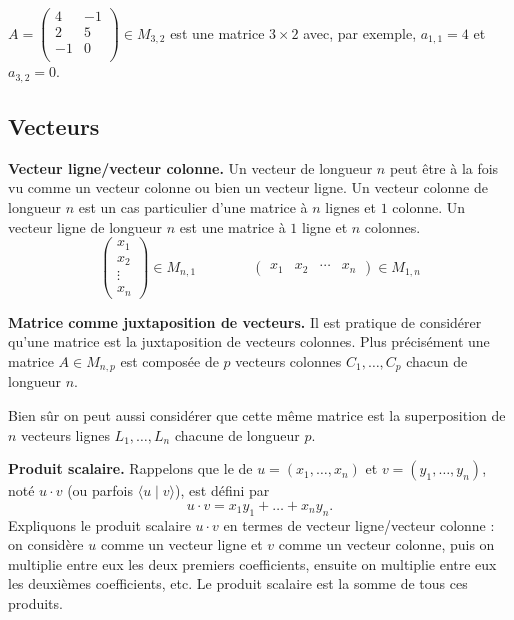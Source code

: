 \documentclass[11pt,class=report,crop=false]{standalone}
\begin{document}
\begin{exemple}
$ A  =  \left(
\begin{array}{ccc}
	4 & -1 \\
	2 & 5  \\
	-1 & 0 \\
\end{array}
\right) \in M_{3,2}$
est une matrice $3\times 2$ avec, par exemple, $a_{1,1}=4$ et $a_{3,2}=0$.
\end{exemple}


\subsection{Vecteurs}

\textbf{Vecteur ligne/vecteur colonne.}
Un vecteur de longueur $n$ peut être à la fois vu comme un vecteur colonne ou bien un vecteur ligne.
Un vecteur colonne de longueur $n$ est un cas particulier d'une matrice à $n$ lignes et $1$ colonne.
Un vecteur ligne de longueur $n$ est une matrice à $1$ ligne et $n$ colonnes.
$$\begin{pmatrix} x_1\\ x_2 \\ \vdots \\ x_n \end{pmatrix} \in M_{n,1}
\qquad \qquad 
\begin{pmatrix} x_1 & x_2 & \cdots & x_n \end{pmatrix} \in M_{1,n}
$$


\textbf{Matrice comme juxtaposition de vecteurs.}
Il est pratique de considérer qu'une matrice est la juxtaposition de vecteurs colonnes. Plus précisément une matrice $A \in M_{n,p}$ est composée de $p$ vecteurs colonnes $C_1,\ldots,C_p$ chacun de longueur $n$.




Bien sûr on peut aussi considérer que cette même matrice est la superposition de $n$ vecteurs lignes $L_1,\ldots,L_n$ chacune de longueur $p$.


\textbf{Produit scalaire.}
Rappelons que le  de $u=(x_1,\ldots ,x_n)$ et $v=(y_1,\ldots ,y_n)$, noté $u \cdot v$ (ou parfois $\langle u \mid v\rangle$), est défini par
$$u \cdot v= x_1y_1+\dots +x_ny_n.$$
Expliquons le produit scalaire $u \cdot v$ en termes de vecteur ligne/vecteur colonne : on considère $u$ comme un vecteur ligne et $v$ comme un vecteur colonne, puis on multiplie entre eux les deux premiers coefficients, ensuite on multiplie entre eux les deuxièmes coefficients, etc. Le produit scalaire est la somme de tous ces produits.
\end{document}
